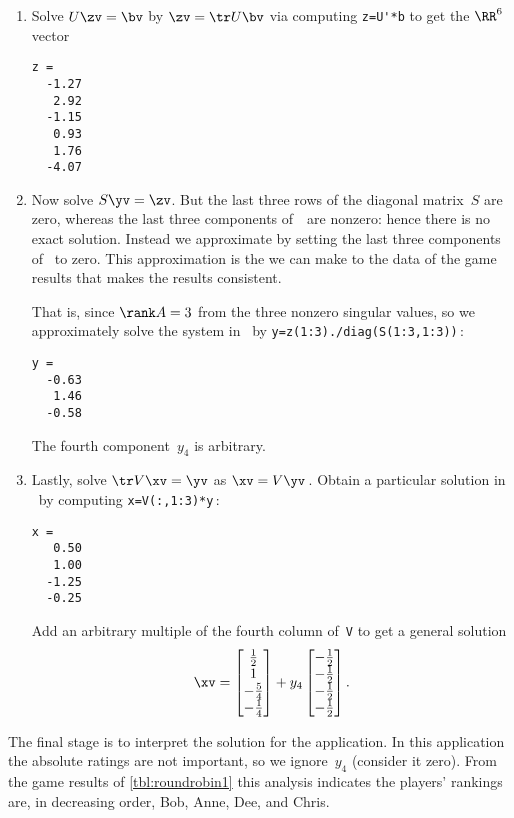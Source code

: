 \begin{example}
\begin{solution}
\begin{enumerate}
\item Solve \(U\zv=\bv\) by  \(\zv=\tr U\bv\) via computing \verb|z=U'*b| to get the \(\RR^6\) vector
\begin{verbatim}
z =
  -1.27
   2.92
  -1.15
   0.93
   1.76
  -4.07
\end{verbatim}

\item Now solve \(S\yv=\zv\).
But the last three rows of the diagonal matrix~\(S\) are zero, whereas the last three components of~\zv\ are nonzero: hence there is no exact solution. 
Instead we approximate by setting the last three components of \zv\ to zero.
This approximation is the \emph{} we can make to the data of the game results that makes the results consistent.

That is, since \(\rank A=3\) from the three nonzero singular values, so we approximately solve the system in \script\ by \verb|y=z(1:3)./diag(S(1:3,1:3))|\,:
\begin{verbatim}
y =
  -0.63
   1.46
  -0.58
\end{verbatim}
The fourth component~\(y_4\) is arbitrary.

\item Lastly, solve \(\tr V\xv=\yv\) as \(\xv=V\yv\)\,. 
Obtain a particular solution in \script\ by computing \verb|x=V(:,1:3)*y|\,:
\begin{verbatim}
x =
   0.50
   1.00
  -1.25
  -0.25
\end{verbatim}
Add an arbitrary multiple of the fourth column of~\verb|V| to get a general solution
\begin{equation*}
\xv=\begin{bmatrix} \frac12\\1\\-\frac54\\-\frac14 \end{bmatrix}
+y_4\begin{bmatrix} -\frac12\\ -\frac12\\ -\frac12\\ -\frac12 \end{bmatrix}.
\end{equation*}
\end{enumerate}
The final stage is to interpret the solution for the application.
In this application the absolute ratings are not important, so we ignore~\(y_4\) (consider it zero).  
From the game results of \cref{tbl:roundrobin1} this analysis indicates the players' rankings are, in decreasing order, Bob, Anne, Dee, and Chris.
\end{solution}
\end{example}



